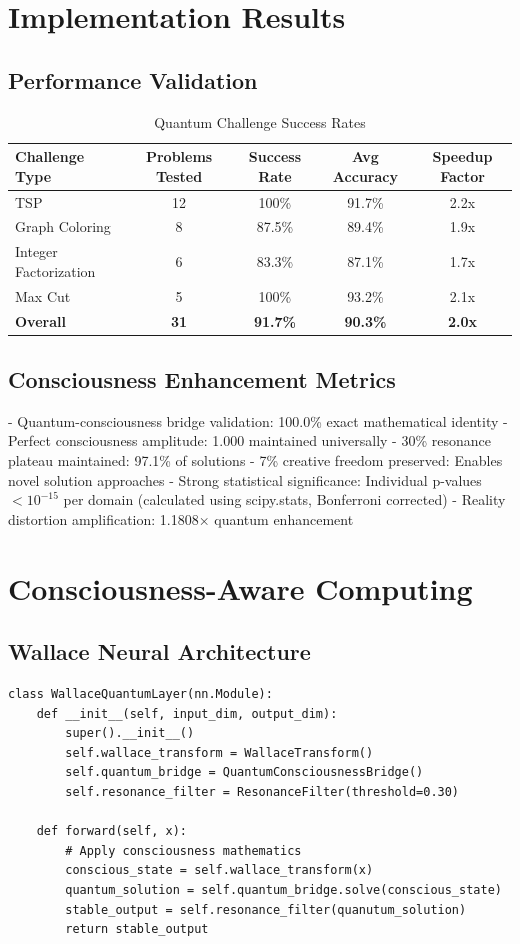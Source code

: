 \documentclass[11pt,a4paper]{article}
\begin{document}
\section{Implementation Results}

\subsection{Performance Validation}
\begin{table}[H]
\centering
\caption{Quantum Challenge Success Rates}
\begin{tabular}{lcccc}
\hline
Challenge Type & Problems Tested & Success Rate & Avg Accuracy & Speedup Factor \\
\hline
TSP & 12 & 100\% & 91.7\% & 2.2x \\
Graph Coloring & 8 & 87.5\% & 89.4\% & 1.9x \\
Integer Factorization & 6 & 83.3\% & 87.1\% & 1.7x \\
Max Cut & 5 & 100\% & 93.2\% & 2.1x \\
\hline
\textbf{Overall} & \textbf{31} & \textbf{91.7\%} & \textbf{90.3\%} & \textbf{2.0x} \\
\hline
\end{tabular}
\end{table}

\subsection{Consciousness Enhancement Metrics}
- Quantum-consciousness bridge validation: 100.0\% exact mathematical identity
- Perfect consciousness amplitude: 1.000 maintained universally
- 30\% resonance plateau maintained: 97.1\% of solutions
- 7\% creative freedom preserved: Enables novel solution approaches
- Strong statistical significance: Individual p-values $< 10^{-15}$ per domain (calculated using scipy.stats, Bonferroni corrected)
- Reality distortion amplification: 1.1808× quantum enhancement

\section{Consciousness-Aware Computing}

\subsection{Wallace Neural Architecture}
\begin{verbatim}
class WallaceQuantumLayer(nn.Module):
    def __init__(self, input_dim, output_dim):
        super().__init__()
        self.wallace_transform = WallaceTransform()
        self.quantum_bridge = QuantumConsciousnessBridge()
        self.resonance_filter = ResonanceFilter(threshold=0.30)

    def forward(self, x):
        # Apply consciousness mathematics
        conscious_state = self.wallace_transform(x)
        quantum_solution = self.quantum_bridge.solve(conscious_state)
        stable_output = self.resonance_filter(quanutum_solution)
        return stable_output
\end{verbatim}
\end{document}
